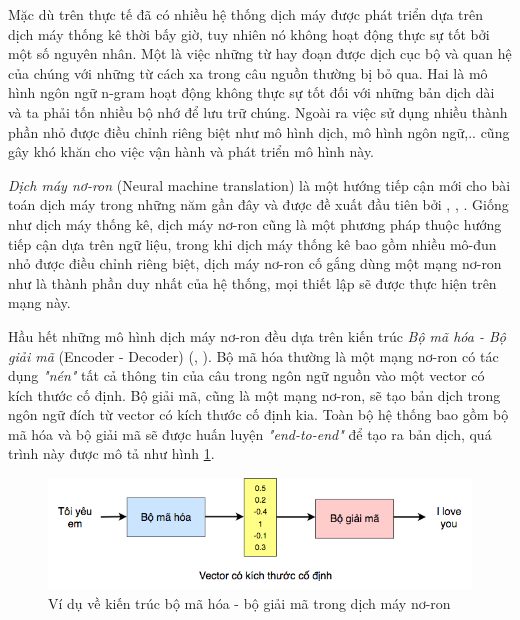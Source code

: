 Mặc dù trên thực tế đã có nhiều hệ thống dịch máy được phát triển dựa trên dịch máy thống kê thời bấy giờ, tuy nhiên nó không hoạt động thực sự tốt bởi một số nguyên nhân. Một là việc những từ hay đoạn được dịch cục bộ và quan hệ của chúng với những từ cách xa trong câu nguồn thường bị bỏ qua. Hai là mô hình ngôn ngữ n-gram hoạt động không thực sự tốt đối với những bản dịch dài và ta phải tốn nhiều bộ nhớ để lưu trữ chúng. Ngoài ra việc sử dụng nhiều thành phần nhỏ được điều chỉnh riêng biệt như mô hình dịch, mô hình ngôn ngữ,.. cũng gây khó khăn cho việc vận hành và phát triển mô hình này.

\textit{Dịch máy nơ-ron} (Neural machine translation) là một hướng tiếp cận mới cho bài toán dịch máy trong những năm gần đây và được đề xuất đầu tiên bởi \cite{kalchbrennerBlunsom}, \cite{Seq2Seq2014}, \cite{cho}. Giống như dịch máy thống kê, dịch máy nơ-ron cũng là một phương pháp thuộc hướng tiếp cận dựa trên ngữ liệu, trong khi dịch máy thống kê bao gồm nhiều mô-đun nhỏ được điều chỉnh riêng biệt, dịch máy nơ-ron cố gắng dùng một mạng nơ-ron như là thành phần duy nhất của hệ thống, mọi thiết lập sẽ được thực hiện trên mạng này. 

Hầu hết những mô hình dịch máy nơ-ron đều dựa trên kiến trúc \textit{Bộ mã hóa - Bộ giải mã} (Encoder - Decoder) (\cite{Seq2Seq2014}, \cite{cho}). Bộ mã hóa thường là một mạng nơ-ron có tác dụng \textit{"nén"} tất cả thông tin của câu trong ngôn ngữ nguồn vào một vector có kích thước cố định. Bộ giải mã, cũng là một mạng nơ-ron, sẽ tạo bản dịch trong ngôn ngữ đích từ vector có kích thước cố định kia. Toàn bộ hệ thống bao gồm bộ mã hóa và bộ giải mã sẽ được huấn luyện \textit{"end-to-end"} để tạo ra bản dịch, quá trình này được mô tả như hình \ref{fig_encoder_decoder}.

\begin{figure}
	\centering
	\includegraphics[width=\textwidth]{intro2nmt}
	\caption[Ví dụ về Kiến trúc \textit{bộ mã hóa - bộ giải mã} trong dịch máy nơ-ron]{Ví dụ về kiến trúc bộ mã hóa - bộ giải mã trong dịch máy nơ-ron}
	\label{fig_encoder_decoder}
\end{figure}

